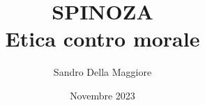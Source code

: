 \documentclass[a4paper,12pt,oneside,openany]{book}%
\begin{document}
	\author{Sandro Della Maggiore}
	\title{\Huge SPINOZA\\{\Large Etica contro morale}}
	\date{Novembre 2023}
	\maketitle
		
	
		
	
	
	
	
	
	

	
\end{document}
